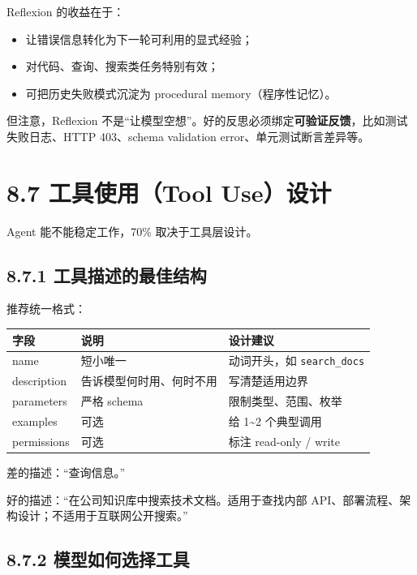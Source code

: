 Reflexion 的收益在于：


\begin{itemize}[leftmargin=2em]
\item 让错误信息转化为下一轮可利用的显式经验；
\item 对代码、查询、搜索类任务特别有效；
\item 可把历史失败模式沉淀为 procedural memory（程序性记忆）。
\end{itemize}

但注意，Reflexion 不是``让模型空想''。好的反思必须绑定\textbf{可验证反馈}，比如测试失败日志、HTTP 403、schema validation error、单元测试断言差异等。


\section{8.7 工具使用（Tool Use）设计}

Agent 能不能稳定工作，70\% 取决于工具层设计。


\subsection{8.7.1 工具描述的最佳结构}

推荐统一格式：


\begingroup
\scriptsize
\setlength{\tabcolsep}{3pt}
\begin{longtable}{|p{}|p{}|p{}|}
\hline
字段 & 说明 & 设计建议 \\ \hline
name & 短小唯一 & 动词开头，如 \texttt{search\_docs} \\ \hline
description & 告诉模型何时用、何时不用 & 写清楚适用边界 \\ \hline
parameters & 严格 schema & 限制类型、范围、枚举 \\ \hline
examples & 可选 & 给 1\textasciitilde{}2 个典型调用 \\ \hline
permissions & 可选 & 标注 read-only / write \\ \hline
\end{longtable}
\endgroup

差的描述：``查询信息。''


好的描述：``在公司知识库中搜索技术文档。适用于查找内部 API、部署流程、架构设计；不适用于互联网公开搜索。''


\subsection{8.7.2 模型如何选择工具}

